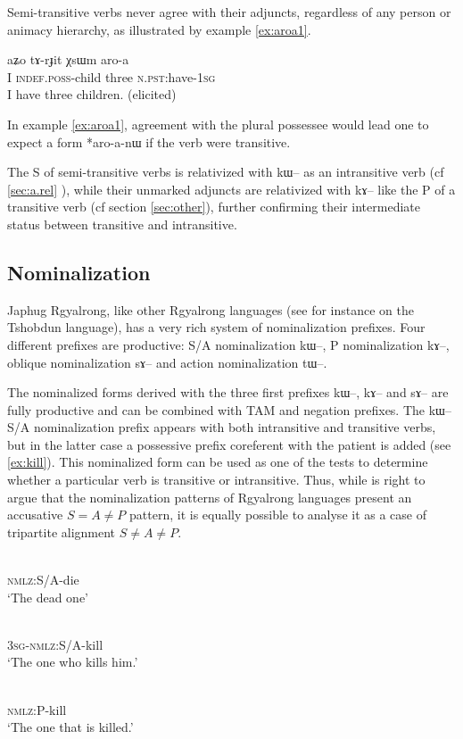 \documentclass[oldfontcommands,oneside,a4paper,11pt]{article}
\newcommand{\ipa}[1]{{\phon #1}} %
\begin{document}
Semi-transitive verbs never agree with their adjuncts, regardless of any person or animacy hierarchy, as illustrated by example \ref{ex:aroa1}.


 \begin{exe}
   \ex   \label{ex:aroa1}
 \gll 
\ipa{aʑo}  	\ipa{tɤ-rɟit}  	\ipa{χsɯm}  	\ipa{aro-a}   \\
I \textsc{indef.poss}-child three \textsc{n.pst:}have-\textsc{1sg} \\
 \glt   I have three children. (elicited)
   \end{exe} 

 
In example \ref{ex:aroa1}, agreement with the plural possessee would lead one to expect a form *\ipa{aro-a-nɯ} if the verb were transitive.

The S of semi-transitive verbs is relativized with \ipa{kɯ}-- as an intransitive verb (cf  \ref{sec:a.rel} ), while their unmarked adjuncts are relativized with \ipa{kɤ--} like the P of a transitive verb (cf section \ref{sec:other}), further confirming their intermediate status between transitive and intransitive.

\subsection{Nominalization} \label{sec:nmlz}

Japhug Rgyalrong, like other Rgyalrong languages (see for instance \citealt{jackson03caodeng} on the Tshobdun language), has a very rich system of nominalization prefixes. Four different prefixes are productive:   S/A nominalization \ipa{kɯ--},   P nominalization \ipa{kɤ--},   oblique nominalization \ipa{sɤ--}  and   action nominalization \ipa{tɯ--}.  

 
The nominalized forms derived with the three first prefixes \ipa{kɯ--}, \ipa{kɤ}-- and \ipa{sɤ}-- are fully productive and can be combined with TAM and negation prefixes.  The \ipa{kɯ--} S/A nominalization prefix appears with both intransitive and transitive verbs, but in the latter case a possessive prefix  coreferent with the patient is added (see \ref{ex:kill}). This nominalized form can be used as one of the tests to determine whether a particular verb is transitive or intransitive. Thus, while \citet{jackson03caodeng} is right to argue that the nominalization patterns of Rgyalrong languages present an accusative $S=A\neq P$ pattern, it is equally possible to analyse it as a case of tripartite alignment $S \neq  A \neq P$.

 \begin{exe}
\ex
\gll \ipa{kɯ-si}    \\
  \textsc{nmlz}:S/A-die \\
 \glt  `The dead one'
 
\ex \label{ex:kill}
\gll \ipa{ɯ-kɯ-sat}    \\
  \textsc{3sg}-\textsc{nmlz}:S/A-kill \\
 \glt  `The one who kills him.'
 

\ex \label{ex:kill2}
\gll \ipa{kɤ-sat}    \\
   \textsc{nmlz}:P-kill \\
 \glt  `The one that is killed.'
 \end{exe}
 
\end{document}
